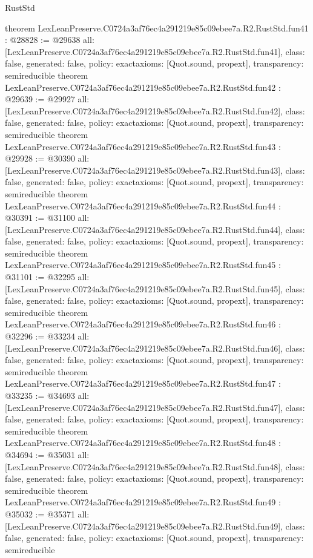 \begin{lexlean}{RustStd}
\begin{coremodule}
{}
theorem LexLeanPreserve.C0724a3af76ec4a291219e85c09ebee7a.R2.RustStd.fun41 : @28828 := @29638 {
  all: [LexLeanPreserve.C0724a3af76ec4a291219e85c09ebee7a.R2.RustStd.fun41],
  class: false,
  generated: false,
  policy: exact{axioms: [Quot.sound, propext]},
  transparency: semireducible
}
theorem LexLeanPreserve.C0724a3af76ec4a291219e85c09ebee7a.R2.RustStd.fun42 : @29639 := @29927 {
  all: [LexLeanPreserve.C0724a3af76ec4a291219e85c09ebee7a.R2.RustStd.fun42],
  class: false,
  generated: false,
  policy: exact{axioms: [Quot.sound, propext]},
  transparency: semireducible
}
theorem LexLeanPreserve.C0724a3af76ec4a291219e85c09ebee7a.R2.RustStd.fun43 : @29928 := @30390 {
  all: [LexLeanPreserve.C0724a3af76ec4a291219e85c09ebee7a.R2.RustStd.fun43],
  class: false,
  generated: false,
  policy: exact{axioms: [Quot.sound, propext]},
  transparency: semireducible
}
theorem LexLeanPreserve.C0724a3af76ec4a291219e85c09ebee7a.R2.RustStd.fun44 : @30391 := @31100 {
  all: [LexLeanPreserve.C0724a3af76ec4a291219e85c09ebee7a.R2.RustStd.fun44],
  class: false,
  generated: false,
  policy: exact{axioms: [Quot.sound, propext]},
  transparency: semireducible
}
theorem LexLeanPreserve.C0724a3af76ec4a291219e85c09ebee7a.R2.RustStd.fun45 : @31101 := @32295 {
  all: [LexLeanPreserve.C0724a3af76ec4a291219e85c09ebee7a.R2.RustStd.fun45],
  class: false,
  generated: false,
  policy: exact{axioms: [Quot.sound, propext]},
  transparency: semireducible
}
theorem LexLeanPreserve.C0724a3af76ec4a291219e85c09ebee7a.R2.RustStd.fun46 : @32296 := @33234 {
  all: [LexLeanPreserve.C0724a3af76ec4a291219e85c09ebee7a.R2.RustStd.fun46],
  class: false,
  generated: false,
  policy: exact{axioms: [Quot.sound, propext]},
  transparency: semireducible
}
theorem LexLeanPreserve.C0724a3af76ec4a291219e85c09ebee7a.R2.RustStd.fun47 : @33235 := @34693 {
  all: [LexLeanPreserve.C0724a3af76ec4a291219e85c09ebee7a.R2.RustStd.fun47],
  class: false,
  generated: false,
  policy: exact{axioms: [Quot.sound, propext]},
  transparency: semireducible
}
theorem LexLeanPreserve.C0724a3af76ec4a291219e85c09ebee7a.R2.RustStd.fun48 : @34694 := @35031 {
  all: [LexLeanPreserve.C0724a3af76ec4a291219e85c09ebee7a.R2.RustStd.fun48],
  class: false,
  generated: false,
  policy: exact{axioms: [Quot.sound, propext]},
  transparency: semireducible
}
theorem LexLeanPreserve.C0724a3af76ec4a291219e85c09ebee7a.R2.RustStd.fun49 : @35032 := @35371 {
  all: [LexLeanPreserve.C0724a3af76ec4a291219e85c09ebee7a.R2.RustStd.fun49],
  class: false,
  generated: false,
  policy: exact{axioms: [Quot.sound, propext]},
  transparency: semireducible
}
\end{coremodule}
\end{lexlean}
